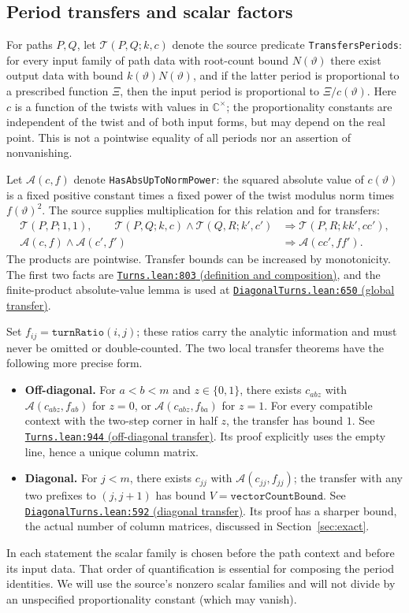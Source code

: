\documentclass[11pt]{article}
\newcommand{\code}[1]{\texttt{#1}}
\newcommand{\base}{https://github.com/VladimirReshetnikov/ProveIt/blob/835c3695d07c0f77060c5cc63f92eeb52a7d21c2/Analysis/GeneralizedRiemannHypothesis}
\newcommand{\auxlink}[3]{\href{\base/Lean/grh/src/New/Determinant/AuxiliaryForms/#1.lean\#L#2}{\texttt{#1.lean:#2} (#3)}}
\newcommand{\Tr}{\mathcal T}
\newcommand{\absup}{\mathcal A}
\begin{document}
\subsection{Period transfers and scalar factors}
For paths $P,Q$, let $\Tr(P,Q;k,c)$ denote the source predicate \code{TransfersPeriods}: for every input family of path data with root-count bound $N(\vartheta)$ there exist output data with bound $k(\vartheta)N(\vartheta)$, and if the latter period is proportional to a prescribed function $\Xi$, then the input period is proportional to $\Xi/c(\vartheta)$. Here $c$ is a function of the twists with values in $\mathbb C^\times$; the proportionality constants are independent of the twist and of both input forms, but may depend on the real point. This is not a pointwise equality of all periods nor an assertion of nonvanishing.

Let $\absup(c,f)$ denote \code{HasAbsUpToNormPower}: the squared absolute value of $c(\vartheta)$ is a fixed positive constant times a fixed power of the twist modulus norm times $f(\vartheta)^2$. The source supplies multiplication for this relation and for transfers:
\begin{align*}
\Tr(P,P;1,1),\qquad
\Tr(P,Q;k,c)\land\Tr(Q,R;k',c')&\Longrightarrow\Tr(P,R;kk',cc'),\\
\absup(c,f)\land\absup(c',f')&\Longrightarrow\absup(cc',ff').
\end{align*}
The products are pointwise. Transfer bounds can be increased by monotonicity. The first two facts are \auxlink{Turns}{803}{definition and composition}, and the finite-product absolute-value lemma is used at \auxlink{DiagonalTurns}{650}{global transfer}.

Set $f_{ij}=\code{turnRatio}(i,j)$; these ratios carry the analytic information and must never be omitted or double-counted. The two local transfer theorems have the following more precise form.
\begin{itemize}
\item \textbf{Off-diagonal.} For $a<b<m$ and $z\in\{0,1\}$, there exists $c_{abz}$ with $\absup(c_{abz}, f_{ab})$ for $z=0$, or $\absup(c_{abz},f_{ba})$ for $z=1$. For every compatible context with the two-step corner in half $z$, the transfer has bound $1$. See \auxlink{Turns}{944}{off-diagonal transfer}. Its proof explicitly uses the empty line, hence a unique column matrix.
\item \textbf{Diagonal.} For $j<m$, there exists $c_{jj}$ with $\absup(c_{jj},f_{jj})$; the transfer with any two prefixes to $(j,j+1)$ has bound $V=\code{vectorCountBound}$. See \auxlink{DiagonalTurns}{592}{diagonal transfer}. Its proof has a sharper bound, the actual number of column matrices, discussed in Section~\ref{sec:exact}.
\end{itemize}
In each statement the scalar family is chosen before the path context and before its input data. That order of quantification is essential for composing the period identities. We will use the source's nonzero scalar families and will not divide by an unspecified proportionality constant (which may vanish).
\end{document}

